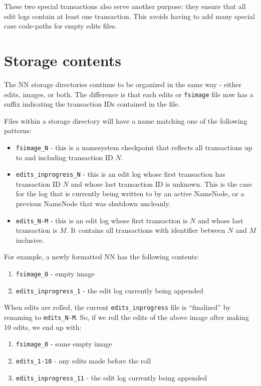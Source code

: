 \documentclass{article}
\begin{document}
These two special transactions also serve another purpose: they ensure that all edit logs
contain at least one transaction. This avoids having to add many special case code-paths
for empty edits files.

\section{Storage contents}

The NN storage directories continue to be organized in the same way - either edits, images, or both.
The difference is that each edits or {\tt fsimage} file now has a suffix indicating the transaction IDs
contained in the file.

Files within a storage directory will have a name matching one of the following patterns:

\begin{itemize}
\item {\tt fsimage\_N} - this is a namesystem checkpoint that reflects all transactions
up to and including transaction ID $N$.
\item {\tt edits\_inprogress\_N} - this is an edit log whose first transaction has transaction
ID $N$ and whose last transaction ID is unknown. This is the case for the log that is currently
being written to by an active NameNode, or a previous NameNode that was shutdown uncleanly.
\item {\tt edits\_N-M} - this is an edit log whose first transaction is $N$ and whose last
transaction is $M$. It contains all transactions with identifier between $N$ and $M$ inclusive.
\end{itemize}

For example, a newly formatted NN has the following contents:

\begin{enumerate}
\item {\tt fsimage\_0} - empty image
\item {\tt edits\_inprogress\_1} - the edit log currently being appended
\end{enumerate}

When edits are rolled, the current {\tt edits\_inprogress} file is ``finalized'' by renaming to {\tt edits\_N-M}.
So, if we roll the edits of the above image after making 10 edits, we end up with:

\begin{enumerate}
\item {\tt fsimage\_0} - same empty image
\item {\tt edits\_1-10} - any edits made before the roll
\item {\tt edits\_inprogress\_11} - the edit log currently being appended
\end{enumerate}
\end{document}
